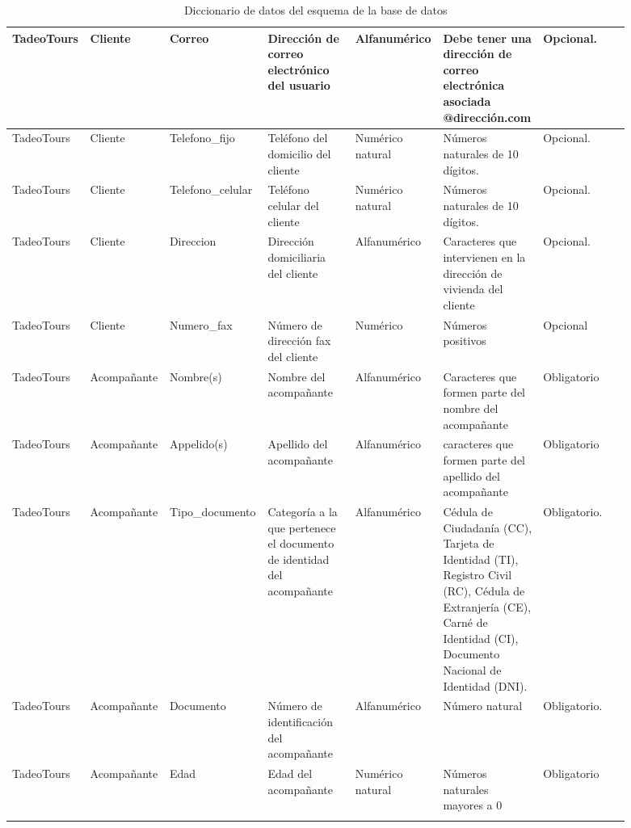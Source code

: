 \documentclass{article}
\begin{document}
\begin{landscape}
\begin{longtable}{|C{0.102\linewidth}|C{0.102\linewidth}|C{0.142\linewidth}|C{0.142\linewidth}|C{0.122\linewidth}|C{0.142\linewidth}|C{0.142\linewidth}|}
TadeoTours & Cliente & Correo & Dirección de correo electrónico del usuario & Alfanumérico & Debe tener una dirección de correo electrónica asociada @dirección.com & Opcional. \\ \hline

TadeoTours & Cliente & Telefono\_fijo & Teléfono del domicilio del cliente & Numérico natural & Números naturales de 10 dígitos. & Opcional. \\ \hline

TadeoTours & Cliente & Telefono\_celular & Teléfono celular del cliente & Numérico natural & Números naturales de 10 dígitos. & Opcional. \\ \hline

TadeoTours & Cliente & Direccion & Dirección domiciliaria del cliente & Alfanumérico & Caracteres que intervienen en la dirección de vivienda del cliente & Opcional. \\ \hline

TadeoTours & Cliente & Numero\_fax & Número de dirección fax del cliente & Numérico & Números positivos & Opcional \\ \hline

TadeoTours & Acompañante & Nombre(s) & Nombre del acompañante & Alfanumérico & Caracteres que formen parte del nombre del acompañante & Obligatorio \\ \hline

TadeoTours & Acompañante & Appelido(s) & Apellido del acompañante & Alfanumérico & caracteres que formen parte del apellido del acompañante & Obligatorio \\ \hline

TadeoTours & Acompañante & Tipo\_documento & Categoría a la que pertenece el documento de identidad del acompañante & Alfanumérico & Cédula de Ciudadanía (CC), Tarjeta de Identidad (TI), Registro Civil (RC), Cédula de Extranjería (CE), Carné de Identidad (CI), Documento Nacional de Identidad (DNI). & Obligatorio. \\ \hline

TadeoTours & Acompañante & Documento & Número de identificación del acompañante & Alfanumérico & Número natural & Obligatorio. \\ \hline

TadeoTours & Acompañante & Edad & Edad del acompañante & Numérico natural & Números naturales mayores a 0 & Obligatorio \\ \hline

\caption{Diccionario de datos del esquema de la base de datos}
\label{tab:diccionario}

\end{longtable}


\end{landscape}
\end{document}

